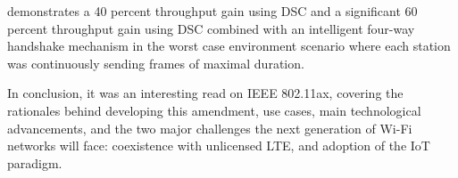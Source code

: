 \documentclass[12pt, a4paper, onside]{article}
\begin{document}
demonstrates a 40 percent throughput gain using DSC and a significant 60 percent throughput gain using DSC combined with an intelligent four-way handshake mechanism in the worst case environment scenario where each station was continuously sending frames of maximal duration.

In conclusion, it was an interesting read on IEEE 802.11ax, covering the rationales behind developing this amendment, use cases, main technological advancements, and the two major challenges the next generation of Wi-Fi networks will face: coexistence with unlicensed LTE, and adoption of the IoT paradigm.

\printbibliography
\end{document}
